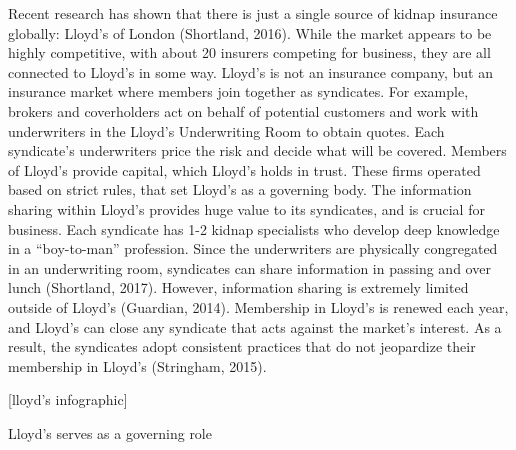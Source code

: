 \documentclass[12pt]{article}
\begin{document}
Recent research has shown that there is just a single source of kidnap insurance globally: Lloyd's of London (Shortland, 2016). While the market appears to be highly competitive, with about 20 insurers competing for business, they are all connected to Lloyd's in some way. Lloyd's is not an insurance company, but an insurance market where members join together as syndicates. For example, brokers and coverholders act on behalf of potential customers and work with underwriters in the Lloyd's Underwriting Room to obtain quotes. Each syndicate's underwriters price the risk and decide what will be covered. Members of Lloyd's provide capital, which Lloyd's holds in trust. These firms operated based on strict rules, that set Lloyd's as a governing body. The information sharing within Lloyd's provides huge value to its syndicates, and is crucial for business. Each syndicate has 1-2 kidnap specialists who develop deep knowledge in a ``boy-to-man'' profession. Since the underwriters are physically congregated in an underwriting room, syndicates can share information in passing and over lunch (Shortland, 2017). However, information sharing is extremely limited outside of Lloyd's (Guardian, 2014). Membership in Lloyd's is renewed each year, and Lloyd's can close any syndicate that acts against the market's interest. As a result, the syndicates adopt consistent practices that do not jeopardize their membership in Lloyd's (Stringham, 2015).

[lloyd's infographic]

Lloyd's serves as a governing role 
\end{document}
